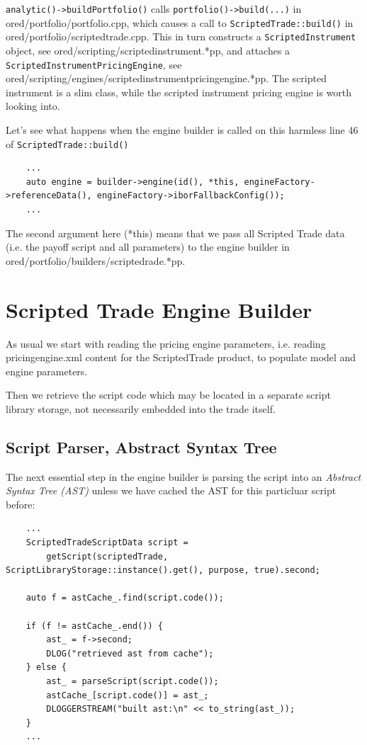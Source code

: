 \documentclass[12pt, a4paper]{report}
\begin{document}
{\tt analytic()->buildPortfolio()} calls {\tt portfolio()->build(...)} in ored/portfolio/portfolio.cpp, which causes a call to {\tt ScriptedTrade::build()} in ored/portfolio/scriptedtrade.cpp. This in turn constructs a {\tt ScriptedInstrument} object, see ored/scripting/scriptedinstrument.*pp, and attaches a {\tt ScriptedInstrumentPricingEngine}, see ored/scripting/engines/scriptedinstrumentpricingengine.*pp.
The scripted instrument is a slim class, while the scripted instrument pricing engine is worth
looking into.

Let's see what happens when the engine builder is called on this harmless line
46 of {\tt ScriptedTrade::build()}

\begin{verbatim}
    ...
    auto engine = builder->engine(id(), *this, engineFactory->referenceData(), engineFactory->iborFallbackConfig());
    ...
\end{verbatim}

The second argument here (*this) means that we pass all Scripted Trade data (i.e. the payoff script
and all parameters) to the engine builder in ored/portfolio/builders/scriptedrade.*pp.

\section{Scripted Trade Engine Builder}

As usual we start with reading the pricing engine parameters, i.e. reading pricingengine.xml content
for the ScriptedTrade product, to populate model and engine parameters.

Then we retrieve the script code which may be located in a separate script library storage, not
necessarily embedded into the trade itself.

\subsection{Script Parser, Abstract Syntax Tree}

The next essential step in the engine builder is parsing the script into an {\em Abstract Syntax
  Tree (AST)} unless we have cached the AST for this particluar script before:

\begin{verbatim}
    ...
    ScriptedTradeScriptData script =
        getScript(scriptedTrade, ScriptLibraryStorage::instance().get(), purpose, true).second;

    auto f = astCache_.find(script.code());

    if (f != astCache_.end()) {
        ast_ = f->second;
        DLOG("retrieved ast from cache");
    } else {
        ast_ = parseScript(script.code());
        astCache_[script.code()] = ast_;
        DLOGGERSTREAM("built ast:\n" << to_string(ast_));
    }
    ...
\end{verbatim}
\end{document}
